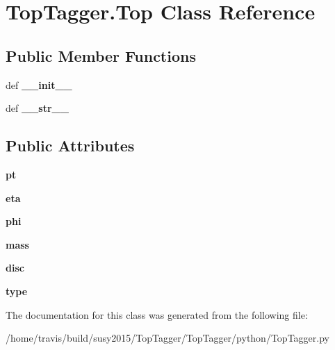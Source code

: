 \hypertarget{classTopTagger_1_1Top}{\section{Top\-Tagger.\-Top Class Reference}
\label{classTopTagger_1_1Top}
}
\subsection*{Public Member Functions}
\begin{DoxyCompactItemize}
\item 
\hypertarget{classTopTagger_1_1Top_abad89dad65df72031cf3adf48c182f34}{def {\bfseries \-\_\-\-\_\-init\-\_\-\-\_\-}}\label{classTopTagger_1_1Top_abad89dad65df72031cf3adf48c182f34}

\item 
\hypertarget{classTopTagger_1_1Top_a067729c8437c2ace6a974c62cf874a50}{def {\bfseries \-\_\-\-\_\-str\-\_\-\-\_\-}}\label{classTopTagger_1_1Top_a067729c8437c2ace6a974c62cf874a50}

\end{DoxyCompactItemize}
\subsection*{Public Attributes}
\begin{DoxyCompactItemize}
\item 
\hypertarget{classTopTagger_1_1Top_a1eab0b54181fd0ea574e57b35ccc59e1}{{\bfseries pt}}\label{classTopTagger_1_1Top_a1eab0b54181fd0ea574e57b35ccc59e1}

\item 
\hypertarget{classTopTagger_1_1Top_a42895f21679a2a03ea4e320a9219b682}{{\bfseries eta}}\label{classTopTagger_1_1Top_a42895f21679a2a03ea4e320a9219b682}

\item 
\hypertarget{classTopTagger_1_1Top_af5ec16e9139fc919b6cca9f222915993}{{\bfseries phi}}\label{classTopTagger_1_1Top_af5ec16e9139fc919b6cca9f222915993}

\item 
\hypertarget{classTopTagger_1_1Top_a2a8d1553340a83f07989044d903813b2}{{\bfseries mass}}\label{classTopTagger_1_1Top_a2a8d1553340a83f07989044d903813b2}

\item 
\hypertarget{classTopTagger_1_1Top_a361f8b14fe698a10a815504bf554b5f9}{{\bfseries disc}}\label{classTopTagger_1_1Top_a361f8b14fe698a10a815504bf554b5f9}

\item 
\hypertarget{classTopTagger_1_1Top_a3da1fcb0f8ea21d672a105e30a03d496}{{\bfseries type}}\label{classTopTagger_1_1Top_a3da1fcb0f8ea21d672a105e30a03d496}

\end{DoxyCompactItemize}


The documentation for this class was generated from the following file\-:\begin{DoxyCompactItemize}
\item 
/home/travis/build/susy2015/\-Top\-Tagger/\-Top\-Tagger/python/Top\-Tagger.\-py\end{DoxyCompactItemize}
